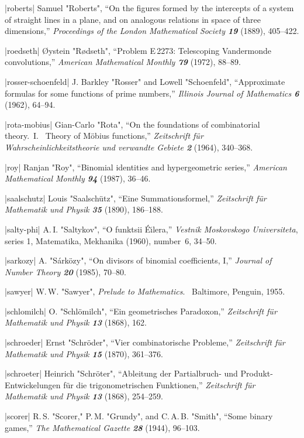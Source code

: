 \bib|roberts|%
Samuel "Roberts", ``On the figures formed by the intercepts of a system
of straight lines in a plane, and on analogous relations in space of
three dimensions,''
{\sl Proceedings of the London Mathematical Society\/ \bf19} (1889), 405--422.

\bib|roedseth|%
\O ystein "R\o dseth", ``Problem E\,2273:
Telescoping Vandermonde convolutions,''
{\sl American Mathematical Monthly\/ \bf79} (1972), 88--89.

\bib|rosser-schoenfeld|%
J. Barkley "Rosser" and Lowell "Schoenfeld", ``Approximate formulas for
some functions of prime numbers,'' {\sl Illinois Journal of Mathematics\/
\bf 6} (1962), 64--94.

\bib|rota-mobius|%
Gian-Carlo "Rota", ``On the foundations of combinatorial theory.~I.~
Theory of M\"obius functions,'' {\sl Zeitschrift f\"ur
Wahrscheinlichkeitstheorie und verwandte Gebiete\/ \bf2} (1964), 340--368.

\bib|roy|%
Ranjan "Roy", ``Binomial identities and hypergeometric series,''
{\sl American Mathematical Monthly\/ \bf94} (1987), 36--46.

\bib|saalschutz|%
Louis "Saalsch\"utz", ``Eine Summationsformel,''
{\sl Zeitschrift f\"ur Mathematik und Physik\/ \bf35} (1890), 186--188.

\bib|salty-phi|%
A.\,I. "Saltykov", ``O funktsii \'E\u{\i}lera,''
{\sl Vestnik Moskovskogo Universiteta}, series 1, Matematika, Mekhanika
(1960), number~6, 34--50.

\bib|sarkozy|%
A. "S\'ark\"ozy", ``On divisors of binomial coefficients, I,''
{\sl Journal of Number Theory\/ \bf20} (1985), 70--80.

\bib|sawyer|%
W.\,W. "Sawyer", {\sl Prelude to Mathematics}. \
Baltimore, Penguin, 1955.

\bib|schlomilch|%
O. "Schl\"omilch", ``Ein geometrisches Paradoxon,''
{\sl Zeitschrift f\"ur Mathematik und Physik\/ \bf13} (1868), 162.

\bib|schroeder|%
Ernst "Schr\"oder", ``Vier combinatorische Probleme,''
{\sl Zeitschrift f\"ur Mathematik und Physik\/ \bf15} (1870), 361--376.

\bib|schroeter|%
Heinrich "Schr\"oter", ``Ableitung der Partialbruch- und Produkt-Entwicke\-lungen %
f\"ur die trigonometrischen Funktionen,''
{\sl Zeitschrift f\"ur Mathematik und Physik\/ \bf13} (1868), 254--259.

\bib|scorer|%
R.\,S. "Scorer," P.\,M. "Grundy", and C.\,A.\,B. "Smith", ``Some binary games,''
{\sl The Mathematical Gazette\/ \bf28} (1944), 96--103.

